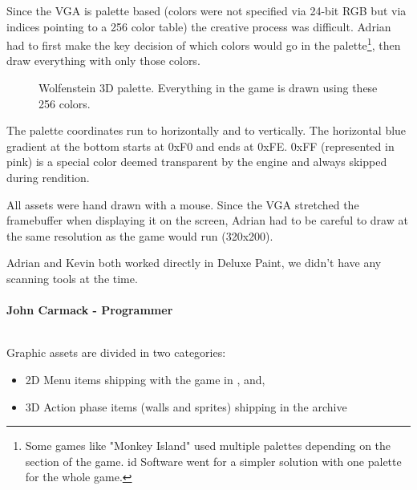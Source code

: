 \documentclass[book.tex]{subfiles}
\begin{document}
\par
Since the VGA is palette based (colors were not specified via 24-bit RGB but via indices pointing to a 256 color table) the creative process was difficult. Adrian had to first make the key decision of which colors would go in the palette\footnote{Some games like "Monkey Island" used multiple palettes depending on the section of the game. id Software went for a simpler solution with one palette for the whole game.}, then draw everything with only those colors.\\
\begin{figure}[H]
  \centering
{}
 \caption{Wolfenstein 3D palette. Everything in the game is drawn using these 256 colors.}
\end{figure}
The palette coordinates run  to  horizontally and  to  vertically. The horizontal blue gradient at the bottom starts at 0xF0 and ends at 0xFE. 0xFF (represented in pink) is a special color deemed transparent by the engine and always skipped during rendition.\\
\par

All assets were hand drawn with a mouse. Since the VGA stretched the framebuffer when displaying it on the screen, Adrian had to be careful to draw at the same resolution as the game would run (320x200).\\
\par
\begin{fancyquotes}
Adrian and Kevin both worked directly in Deluxe Paint, we didn't have any scanning tools at the time.\\
\\
\textbf{John Carmack - Programmer}
\end{fancyquotes}
\\
Graphic assets are divided in two categories:
\begin{itemize}
\item 2D Menu items shipping with the game in ,  and, 
\item 3D Action phase items (walls and sprites) shipping in the  archive
\end{itemize}
\end{document}
